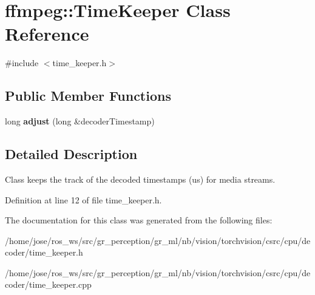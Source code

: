 \hypertarget{classffmpeg_1_1TimeKeeper}{}\section{ffmpeg\+:\+:Time\+Keeper Class Reference}
\label{classffmpeg_1_1TimeKeeper}


{\ttfamily \#include $<$time\+\_\+keeper.\+h$>$}

\subsection*{Public Member Functions}
\begin{DoxyCompactItemize}
\item 
\mbox{\label{classffmpeg_1_1TimeKeeper_a815a844c9832400a197f20e92674394d}} 
long {\bfseries adjust} (long \&decoder\+Timestamp)
\end{DoxyCompactItemize}


\subsection{Detailed Description}
Class keeps the track of the decoded timestamps (us) for media streams. 

Definition at line 12 of file time\+\_\+keeper.\+h.



The documentation for this class was generated from the following files\+:\begin{DoxyCompactItemize}
\item 
/home/jose/ros\+\_\+ws/src/gr\+\_\+perception/gr\+\_\+ml/nb/vision/torchvision/csrc/cpu/decoder/time\+\_\+keeper.\+h\item 
/home/jose/ros\+\_\+ws/src/gr\+\_\+perception/gr\+\_\+ml/nb/vision/torchvision/csrc/cpu/decoder/time\+\_\+keeper.\+cpp\end{DoxyCompactItemize}
